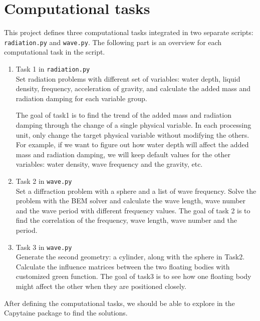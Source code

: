 \documentclass{article}
\begin{document}
\section{Computational tasks}
This project defines three computational tasks integrated in two separate scripts: \texttt{radiation.py} and \texttt{wave.py}. The following part is an overview for each computational task in the script.
\begin{enumerate}
    \item Task 1 in \texttt{radiation.py}\\
    Set radiation problems with different set of variables: water depth, liquid density, frequency, acceleration of gravity, and calculate the added mass and radiation damping for each variable group. 
    
    The goal of task1 is to find the trend of the added mass and radiation damping through the change of a single physical variable. In each processing unit, only change the target physical variable without modifying the others. For example, if we want to figure out how water depth will affect the added mass and radiation damping, we will keep default values for the other variables: water density, wave frequency and the gravity, etc.
    \item Task 2 in \texttt{wave.py}\\
    Set a diffraction problem with a sphere and a list of wave frequency. Solve the problem with the BEM solver and calculate the wave length, wave number and the wave period with different frequency values. The goal of task 2 is to find the correlation of the frequency, wave length, wave number and the period.
    \item Task 3 in \texttt{wave.py}\\
    Generate the second geometry: a cylinder, along with the sphere in Task2. Calculate the influence matrices between the two floating bodies with customized green function. The goal of task3 is to see how one floating body might affect the other when they are positioned closely.
\end{enumerate}
After defining the computational tasks, we should be able to explore in the Capytaine package to find the solutions.
\end{document}
